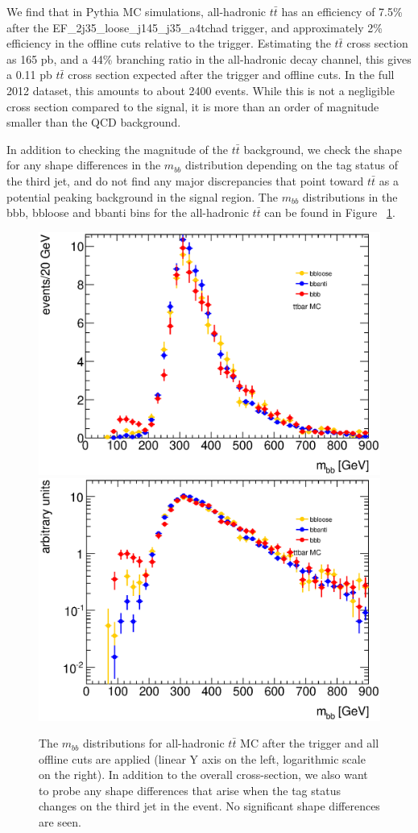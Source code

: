We find that in Pythia MC simulations, all-hadronic $t\bar{t}$ has an efficiency of 7.5\% after
the EF\_2j35\_loose\_j145\_j35\_a4tchad trigger, and approximately 2\% efficiency
in the offline cuts relative to the trigger.  Estimating the $t\bar{t}$ cross section
as 165 pb, and a 44\% branching ratio in the all-hadronic decay channel, this gives
a 0.11 pb $t\bar{t}$ cross section expected after the trigger and offline cuts.  In the
full 2012 dataset, this amounts to about 2400 events.  While
this is not a negligible cross section compared to the signal, it is more than an
order of magnitude smaller than the QCD background.

In addition to checking the magnitude of the $t\bar{t}$ background, we check the shape
for any shape differences in the $m_{bb}$ distribution depending on the tag status of the
third jet, and do not find any major discrepancies that point toward $t\bar{t}$ as a
potential peaking background in the signal region. The $m_{bb}$ distributions in the
bbb, bbloose and bbanti bins for the all-hadronic $t\bar{t}$ can be found in Figure
~\ref{fig:ttbar_mbb}.




\begin{figure}[hbt]
\includegraphics[width=0.45\linewidth]{BackgroundEstimation/images/mbb_compare_bbb_bbloose_bbanti_ttbar.eps}
\includegraphics[width=0.45\linewidth]{BackgroundEstimation/images/mbb_compare_bbb_bbloose_bbanti_ttbar_logy.eps}
\caption{The $m_{bb}$ distributions for all-hadronic $t\bar{t}$ MC after the trigger and all offline cuts are applied (linear Y axis on the left, logarithmic scale on the right).  In addition to the overall cross-section, we also want to probe any shape differences that arise when the tag status changes on the third jet in the event.  No significant shape differences are seen.}
\label{fig:ttbar_mbb}
\end{figure}

















